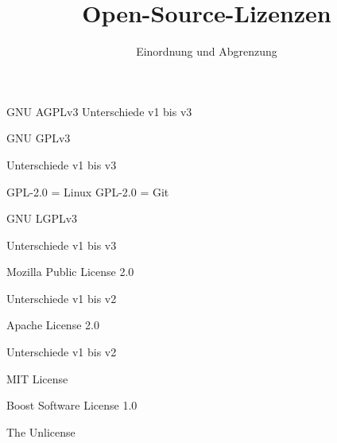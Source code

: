 \documentclass{beamer}
\title{Open-Source-Lizenzen}
\subtitle{Einordnung und Abgrenzung}
\begin{document}
\maketitle

\begin{frame}
	\Large{GNU AGPLv3}
	Unterschiede v1 bis v3
\end{frame}

\begin{frame}
	\Large{GNU GPLv3}

	Unterschiede v1 bis v3

	GPL-2.0 = Linux
	GPL-2.0 = Git
\end{frame}

\begin{frame}
	\Large{GNU LGPLv3}

	Unterschiede v1 bis v3
\end{frame}

\begin{frame}
	\Large{Mozilla Public License 2.0}

	Unterschiede v1 bis v2
\end{frame}

\begin{frame}
	\Large{Apache License 2.0}

	Unterschiede v1 bis v2
\end{frame}

\begin{frame}
	\Large{MIT License}
\end{frame}

\begin{frame}
	\Large{Boost Software License 1.0}
\end{frame}

\begin{frame}
	\Large{The Unlicense}
\end{frame}
\end{document}
